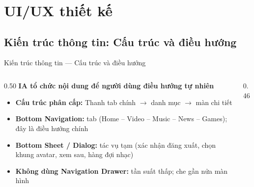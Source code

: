 \section{UI/UX thiết kế}

\subsection{Kiến trúc thông tin: Cấu trúc và điều hướng}
\begin{frame}{Kiến trúc thông tin --- Cấu trúc và điều hướng}
\begin{columns}[T]
\begin{column}{0.50\textwidth}
\footnotesize
\textbf{IA tổ chức nội dung để người dùng điều hướng tự nhiên}
\vspace{2mm}
{\tiny
\begin{itemize}\setlength{\itemsep}{4pt}
\item \textbf{Cấu trúc phân cấp:} \newline Thanh tab chính $\rightarrow$ danh mục $\rightarrow$ màn chi tiết
\item \textbf{Bottom Navigation:}  tab (Home -- Video -- Music -- News -- Games); đây là điều hướng chính
\item \textbf{Bottom Sheet / Dialog:} \newline tác vụ tạm (xác nhận đăng xuất, chọn khung avatar, xem sau, hàng đợi nhạc)
\item \textbf{Không dùng Navigation Drawer:} \newline tần suất thấp; che gần nửa màn hình
\end{itemize}}
\end{column}
\begin{column}{0.46\textwidth}
\centering
{}
\end{column}
\end{columns}
\end{frame}
